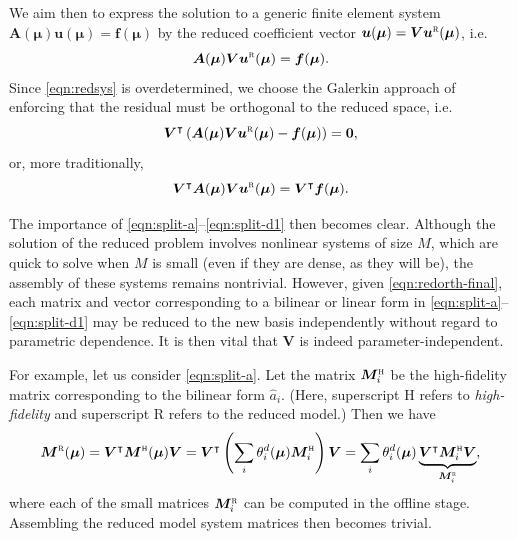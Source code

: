 \documentclass[onecolumn, twoside, a4paper, 11pt]{article}
\begin{document}
We aim then to express the solution to a generic finite element system
$\bm A(\bm \mu) \bm u(\bm \mu) = \bm f(\bm \mu)$ by the reduced
coefficient vector $\bm u(\bm \mu) = \bm V \bm u^\textsc{r}(\bm \mu)$, i.e.
\begin{equation}
  \label{eqn:redsys}
  \bm A(\bm \mu) \bm V \bm u^\textsc{r}(\bm \mu) = \bm f(\bm \mu).
\end{equation}
Since \eqref{eqn:redsys} is overdetermined, we choose the Galerkin
approach of enforcing that the residual must be orthogonal to the
reduced space, i.e.
\begin{equation}
  \label{eqn:redorth}
  \bm V^\intercal \left(
  \bm A(\bm \mu) \bm V \bm u^\textsc{r}(\bm \mu) - \bm f(\bm \mu)
  \right) = \bm 0,
\end{equation}
or, more traditionally,
\begin{equation}
  \label{eqn:redorth-final}
  \bm V^\intercal \bm A(\bm \mu) \bm V \bm u^\textsc{r}(\bm \mu) =
  \bm V^\intercal \bm f(\bm \mu).
\end{equation}

The importance of \eqref{eqn:split-a}--\eqref{eqn:split-d1} then
becomes clear.  Although the solution of the reduced problem involves
nonlinear systems of size $M$, which are quick to solve when $M$ is
small (even if they are dense, as they will be), the assembly of these
systems remains nontrivial. However, given \eqref{eqn:redorth-final},
each matrix and vector corresponding to a bilinear or linear form in
\eqref{eqn:split-a}--\eqref{eqn:split-d1} may be reduced to the new
basis independently without regard to parametric dependence. It is
then vital that $\bm V$ is indeed parameter-independent.

For example, let us consider \eqref{eqn:split-a}. Let the matrix
$\bm M^\textsc{h}_i$ be the high-fidelity matrix corresponding to the bilinear
form $\hat{a}_i$. (Here, superscript H refers to \emph{high-fidelity} and
superscript R refers to the reduced model.) Then we have
\begin{equation}
  \bm M^\textsc{r}(\bm \mu)
  = \bm V^\intercal \bm M^\textsc{h}(\bm \mu) \bm V
  = \bm V^\intercal \left( \sum_i \theta^d_i(\bm \mu) \bm M^\textsc{h}_i \right) \bm V
  = \sum_i \theta^d_i(\bm \mu) \underbrace{\bm V^\intercal \bm M^\textsc{h}_i \bm V}_{\bm M^\textsc{r}_i},
\end{equation}
where each of the small matrices $\bm M^\textsc{r}_i$ can be computed in the
offline stage. Assembling the reduced model system matrices then becomes
trivial.
\end{document}
